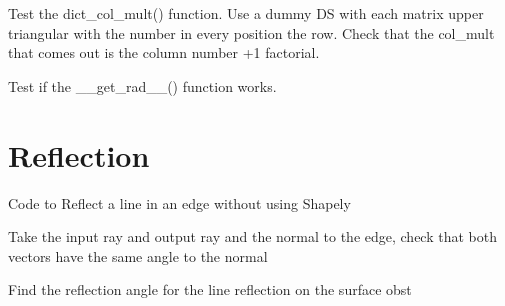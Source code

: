 \documentclass[letterpaper,10pt,english]{sphinxmanual}
\begin{document}

\begin{fulllineitems}
\label{index:DictionarySparseMatrix.test_20}
Test the dict\_col\_mult() function.
Use a dummy DS with each matrix upper triangular with the number in   every position the row.
Check that the col\_mult that comes out is the column number +1   factorial.

\end{fulllineitems}


\begin{fulllineitems}
\label{index:DictionarySparseMatrix.test_21}
Test if the \_\_get\_rad\_\_() function works.

\end{fulllineitems}



\chapter{Reflection}
\label{index:reflection}\label{index:module-reflection}
Code to Reflect a line in an edge without using Shapely

\begin{fulllineitems}
\label{index:reflection.errorcheck}
Take the input ray and output ray and the normal to the edge,
check that both vectors have the same angle to the normal

\end{fulllineitems}


\begin{fulllineitems}
\label{index:reflection.refangle}
Find the reflection angle for the line reflection on the surface obst

\end{fulllineitems}

\end{document}
